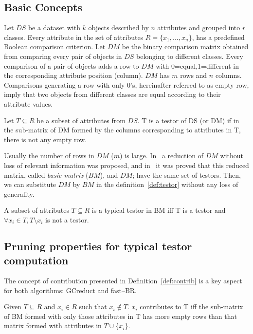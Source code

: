 \documentclass[citenumber]{llncs}
\begin{document}
%
\subsection{Basic Concepts} \label{basic_concetps}
%

Let $DS$ be a dataset with $k$ objects described by $n$ attributes and grouped into $r$ classes. Every attribute in the set of attributes $R=\lbrace x_1,...,x_n \rbrace$, has a predefined Boolean comparison criterion. Let $DM$ be the binary comparison matrix obtained from comparing every pair of objects in $DS$ belonging to different classes. Every comparison of a pair of objects adds a row to $DM$ with 0=equal,1=different in the corresponding attribute position (column). $DM$ has $m$ rows and $n$ columns. Comparisons generating a row with only 0's, hereinafter referred to as empty row, imply that two objects from different classes are equal according to their attribute values. 

\begin{definition}\label{def:testor}
	Let $T \subseteq R$ be a subset of attributes from $DS$. T is a testor of DS (or DM) if in the sub-matrix of DM formed by the columns corresponding to attributes in T, there is not any empty row.
\end{definition} 	

Usually the number of rows in $DM$ ($m$) is large. In~\cite{Lazo01} a reduction of $DM$ without loss of relevant information was proposed, and in~\cite{Piza17} it was proved that this reduced matrix, called \textit{basic matrix} ($BM$), and $DM$; have the same set of testors. Then, we can substitute $DM$ by $BM$ in the definition~\ref{def:testor} without any loss of generality. 	

\begin{definition}\label{def:TT}
	A subset of attributes $T \subseteq R$ is a typical testor in BM iff T is a testor and $\forall x_i \in T, T \setminus x_i$ is not a testor. 
\end{definition}

%	
\subsection{Pruning properties for typical testor computation}
%

	The concept of contribution presented in Definition~\ref{def:contrib} is a key aspect for both algorithms: GCreduct and fast--BR. 	
	
	\begin{definition}\label{def:contrib}
		Given $T \subseteq R$ and $x_i \in R$ such that $x_i \notin T$. $x_i$ contributes to T iff the sub-matrix of BM formed with only those attributes in T has more empty rows than that matrix formed with attributes in $T \cup \lbrace x_i \rbrace$.
	\end{definition}	
	
\end{document}
